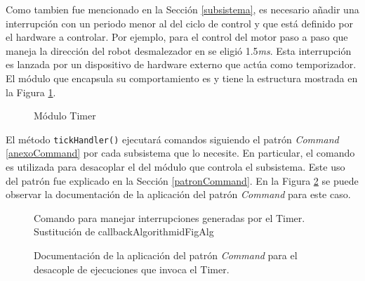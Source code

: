 
Como tambien fue mencionado en la Sección \ref{subsistema}, es necesario añadir una interrupción con un periodo menor al del ciclo de control y que está definido por el hardware a controlar. Por ejemplo, para el control del motor paso a paso que maneja la dirección del robot desmalezador en \cite{paperPomponio} se eligió 1.5\textit{ms}. Esta interrupción es lanzada por un dispositivo de hardware externo que actúa como temporizador. El módulo que encapsula su comportamiento es \Timer y tiene la estructura mostrada en la Figura \ref{moduloTimer}.

\begin{figure}[H]
\caption{Módulo Timer}
\label{moduloTimer}
\begin{center}
\end{center}
\end{figure}

El método \verb|tickHandler()| ejecutará comandos siguiendo el patrón \textit{Command} \ref{anexoCommand} por cada subsistema que lo necesite. En particular, el comando es utilizada para desacoplar el \Timer del módulo que controla el subsistema. Este uso del patrón fue explicado en la Sección \ref{patronCommand}. En la Figura \ref{docCommandTimer} se puede observar la documentación de la aplicación del patrón \textit{Command} para este caso.

\begin{figure}[H]
\caption{Documentación de la aplicación del patrón \textit{Command} para el desacople de ejecuciones que invoca el Timer.}
\label{docCommandTimer}
\begin{pattern}[]{Comando para manejar interrupciones generadas por el Timer.
Sustitución de callback}{Algorithm}{idFigAlg}
\assigns
{}
\end{pattern}
\end{figure}


